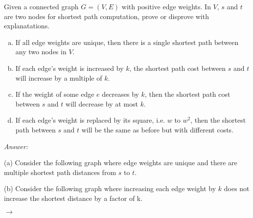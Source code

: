 \documentclass[12pt]{article}
\newenvironment{problem}[2][Problem]{\begin{trivlist}
\item[\hskip \labelsep {\bfseries #1}\hskip \labelsep {\bfseries #2.}]}{\end{trivlist}}
\begin{document}
\begin{problem}{4}
    Given a connected graph $G=(V,E)$ with positive edge weights. In $V$, $s$ and $t$ are two nodes for shortest path computation, prove or disprove with explanatations.
    \begin{enumerate}[(a)]
        \item If all edge weights are unique, then there is a single shortest path between any two nodes in $V$.
        \item If each edge's weight is increased by $k$, the shortest path cost between $s$ and $t$ will increase by a multiple of $k$.
        \item If the weight of some edge $e$ decreases by $k$, then the shortest path cost between $s$ and $t$ will decrease by at most $k$.
        \item If each edge's weight is replaced by its square, i.e. $w$ to $w^2$, then the shortest path between $s$ and $t$ will be the same as before but with different costs.
    \end{enumerate}
\end{problem}
\textit{Answer:}

(a) Consider the following graph where edge weights are unique and there are multiple shortest path distances from $s$ to $t$.


(b) Consider the following graph where increasing each edge weight by $k$ does not increase the shortest distance by a factor of k.

$\rightarrow$
\end{document}
